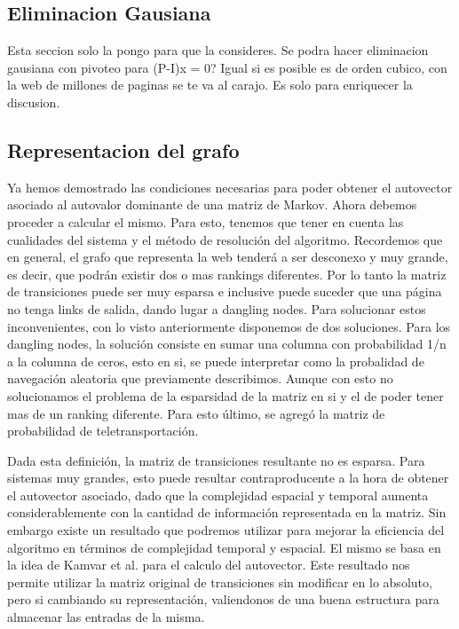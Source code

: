 \subsection{Eliminacion Gausiana}

Esta seccion solo la pongo para que la consideres. Se podra hacer eliminacion gausiana con pivoteo para (P-I)x = 0? Igual si es posible es de orden cubico, con la web de millones de paginas se te va al carajo. Es solo para enriquecer la discusion.

\subsection{Representacion del grafo}

Ya hemos demostrado las condiciones necesarias para poder obtener el autovector asociado al autovalor dominante de una matriz de Markov. 
Ahora debemos proceder a calcular el mismo. Para esto, tenemos que tener en cuenta las cualidades del sistema y el método de resolución del algoritmo. Recordemos que en general, el grafo que representa la web tenderá a ser desconexo y muy grande, es decir, que podrán existir dos o mas rankings diferentes. Por lo tanto la matriz 
de transiciones puede ser muy esparsa e inclusive puede suceder que una página no tenga links de salida, dando lugar a dangling nodes. Para solucionar estos inconvenientes, con lo visto anteriormente disponemos de dos soluciones. Para los dangling nodes, la solución consiste en sumar una columna con probabilidad 1/n a la columna de ceros, esto en si, se puede interpretar como la probalidad de navegación aleatoria que previamente describimos. Aunque con esto no solucionamos el problema de la esparsidad de la matriz en si y el de poder tener mas de un ranking diferente. Para esto último, se agregó la matriz de probabilidad de teletransportación.

Dada esta definición, la matriz de transiciones resultante no es esparsa. 
Para sistemas muy grandes, esto puede resultar contraproducente a la hora de obtener el autovector asociado, dado que la complejidad espacial y temporal aumenta  considerablemente con la cantidad de información representada en la matriz. Sin embargo existe un resultado que podremos utilizar para mejorar la eficiencia del algoritmo en términos de complejidad temporal y espacial. El mismo se basa en la idea de Kamvar et al. \cite[Algoritmo 1]{Kamvar2003} para el calculo del autovector. Este resultado nos permite utilizar la matriz original de transiciones sin modificar en lo absoluto, pero si cambiando su representación, valiendonos de una buena estructura para almacenar las entradas de la misma. 

